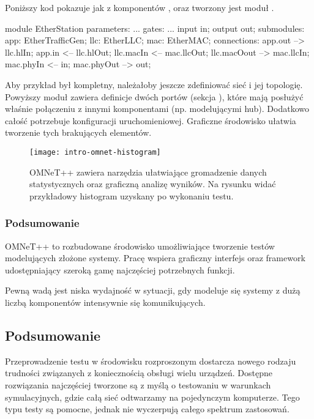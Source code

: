 \documentclass[00-praca-magisterska.tex]{subfiles}
\begin{document}
Poniższy kod pokazuje jak z komponentów , 
oraz  tworzony jest moduł .

\begin{textcode}
  module EtherStation {
      parameters: ...
      gates: ...
          input in;
          output out;  
      submodules:
          app: EtherTrafficGen;
          llc: EtherLLC;
          mac: EtherMAC;
      connections:
          app.out --> llc.hlIn;
          app.in <-- llc.hlOut;
          llc.macIn <-- mac.llcOut;
          llc.macOout --> mac.llcIn;
          mac.phyIn <-- in;
          mac.phyOut --> out;
  }
\end{textcode}

Aby przykład był kompletny, należałoby jeszcze zdefiniować sieć i jej
topologię.  Powyższy moduł zawiera definicje dwóch portów (sekcja
), które mają posłużyć właśnie połączeniu z innymi komponentami
(np. modelującymi hub). Dodatkowo całość potrzebuje konfiguracji
uruchomieniowej. Graficzne środowisko ułatwia tworzenie tych brakujących elementów.

\begin{figure}
\begin{center}
\leavevmode
\texttt{[image: intro-omnet-histogram]}
\end{center}
\caption{OMNeT++ zawiera narzędzia ułatwiające gromadzenie
danych statystycznych oraz graficzną analizę wyników. Na rysunku widać
przykładowy histogram uzyskany po wykonaniu testu.}
\label{fig:intro-omnet-histogram}
\end{figure}

\subsubsection{Podsumowanie}

OMNeT++ to rozbudowane środowisko umożliwiające tworzenie testów modelujących
złożone systemy. Pracę wspiera graficzny interfejs oraz framework
udostępniający szeroką gamę najczęściej potrzebnych funkcji.

Pewną wadą jest niska wydajność w sytuacji, gdy modeluje się systemy z dużą
liczbą komponentów intensywnie się komunikujących.

\subsection{Podsumowanie}

Przeprowadzenie testu w środowisku rozproszonym dostarcza nowego rodzaju
trudności związanych z koniecznością obsługi wielu urządzeń. Dostępne
rozwiązania najczęściej tworzone są z myślą o testowaniu w warunkach
symulacyjnych, gdzie całą sieć odtwarzamy na pojedynczym komputerze. Tego typu
testy są pomocne, jednak nie wyczerpują całego spektrum zastosowań.
\end{document}
